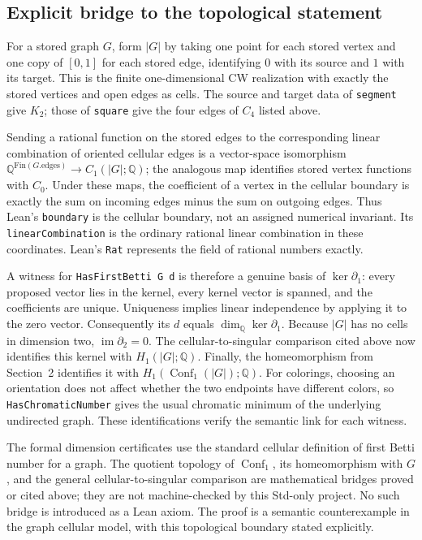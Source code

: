 \documentclass[11pt]{article}
\newcommand{\Conf}{\operatorname{Conf}}
\newcommand{\Q}{\mathbb{Q}}
\begin{document}
\subsection{Explicit bridge to the topological statement}
For a stored graph $G$, form $|G|$ by taking one point for each stored
vertex and one copy of $[0,1]$ for each stored edge, identifying $0$ with
its source and $1$ with its target. This is the finite one-dimensional CW
realization with exactly the stored vertices and open edges as cells.
The source and target data of \texttt{segment} give $K_2$; those of
\texttt{square} give the four edges of $C_4$ listed above.

Sending a rational function on the stored edges to the corresponding
linear combination of oriented cellular edges is a vector-space
isomorphism $\Q^{\mathrm{Fin}(G.\mathrm{edges})}\to C_1(|G|;\Q)$;
the analogous map identifies stored vertex functions with $C_0$.
Under these maps, the coefficient of a vertex in the cellular boundary
is exactly the sum on incoming edges minus the sum on outgoing edges.
Thus Lean's \texttt{boundary} is the cellular boundary, not an assigned
numerical invariant. Its \texttt{linearCombination} is the ordinary
rational linear combination in these coordinates. Lean's \texttt{Rat}
represents the field of rational numbers exactly.

A witness for \texttt{HasFirstBetti G d} is therefore a genuine basis
of $\ker\partial_1$: every proposed vector lies in the kernel, every
kernel vector is spanned, and the coefficients are unique. Uniqueness
implies linear independence by applying it to the zero vector.
Consequently its $d$ equals $\dim_\Q\ker\partial_1$.
Because $|G|$ has no cells in dimension two, $\operatorname{im}\partial_2=0$.
The cellular-to-singular comparison cited above now identifies this
kernel with $H_1(|G|;\Q)$. Finally, the homeomorphism from Section~2
identifies it with $H_1(\Conf_1(|G|);\Q)$.
For colorings, choosing an orientation does not affect whether the two
endpoints have different colors, so \texttt{HasChromaticNumber} gives the
usual chromatic minimum of the underlying undirected graph.
These identifications verify the semantic link for each witness.

The formal dimension certificates use the standard cellular definition of
first Betti number for a graph. The quotient topology of $\Conf_1$, its
homeomorphism with $G$, and the general cellular-to-singular comparison
are mathematical bridges proved or cited above; they are not machine-checked
by this Std-only project. No such bridge is introduced as a Lean axiom.
The proof is a semantic counterexample in the graph cellular model,
with this topological boundary stated explicitly.
\end{document}
